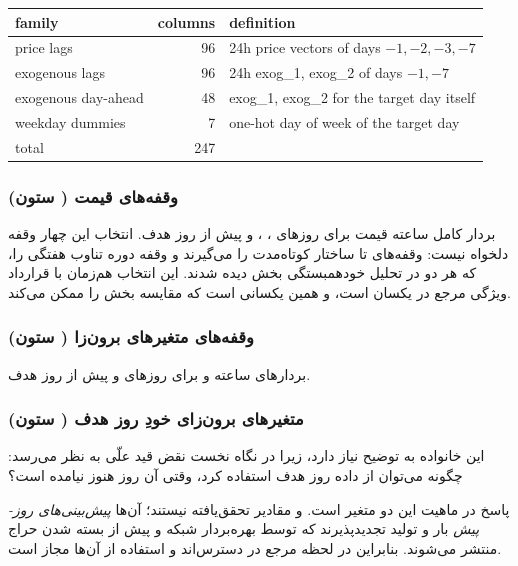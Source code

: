 \begin{center}
\begin{latin}
\begin{tabular}{lrl}
\hline
family & columns & definition \\
\hline
price lags        & 96 & 24h price vectors of days $-1,-2,-3,-7$ \\
exogenous lags    & 96 & 24h exog\_1, exog\_2 of days $-1,-7$ \\
exogenous day-ahead & 48 & exog\_1, exog\_2 for the target day itself \\
weekday dummies   &  7 & one-hot day of week of the target day \\
\hline
total             & 247 & \\
\hline
\end{tabular}
\end{latin}
\end{center}

\subsubsection*{وقفه‌های قیمت ( ستون)}

بردار کامل ‌ساعته قیمت برای روزهای ، ،  و
 پیش از روز هدف. انتخاب این چهار وقفه دلخواه نیست: وقفه‌های 
تا  ساختار کوتاه‌مدت را می‌گیرند و وقفه  دوره تناوب هفتگی را،
که هر دو در تحلیل خودهمبستگی بخش  دیده شدند. این انتخاب
هم‌زمان با قرارداد ویژگی مرجع  در \cite{lago_forecasting_2021}
یکسان است، و همین یکسانی است که مقایسه بخش  را ممکن می‌کند.

\subsubsection*{وقفه‌های متغیرهای برون‌زا ( ستون)}

بردارهای ‌ساعته  و  برای روزهای  و
 پیش از روز هدف.

\subsubsection*{متغیرهای برون‌زای خودِ روز هدف ( ستون)}

این خانواده به توضیح نیاز دارد، زیرا در نگاه نخست نقض قید علّی به نظر
می‌رسد: چگونه می‌توان از داده روز هدف استفاده کرد، وقتی آن روز هنوز
نیامده است؟

پاسخ در ماهیت این دو متغیر است.  و  مقادیر
تحقق‌یافته نیستند؛ آن‌ها \emph{پیش‌بینی‌های روز-پیش} بار و تولید
تجدیدپذیرند که توسط بهره‌بردار شبکه و پیش از بسته شدن حراج منتشر
می‌شوند. بنابراین در لحظه مرجع در دسترس‌اند و استفاده از آن‌ها مجاز است.

